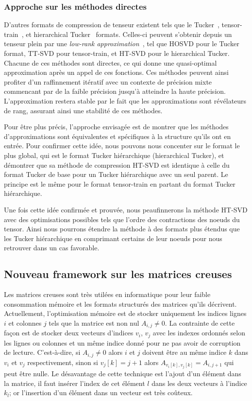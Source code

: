 \subsubsection*{Approche sur les méthodes directes}

D'autres formats de compression de tenseur existent tels que le
Tucker~\cite{tucker66, dedeva20b}, tensor-train~\cite{os11}, et hierarchical
Tucker~\cite{haku09, gras10} formats. Celles-ci peuvent s'obtenir depuis un
tenseur plein par une \textit{low-rank approximation}~\cite{koba09, os11}, tel
que HOSVD pour le Tucker format, TT-SVD pour tensor-train, et HT-SVD pour le
hierarchical Tucker. Chacune de ces méthodes sont directes, ce qui donne une
quasi-optimal approximation après un appel de ces fonctions. Ces méthodes
peuvent ainsi profiter d'un raffinnement itératif avec un contexte de précision
mixte commencant par de la faible précision jusqu'à atteindre la haute
précision. L'approximation restera stable par le fait que les approximations
sont révélateurs de rang, assurant ainsi une stabilité de ces méthodes.

Pour être plus précis, l'approche envisagée est de montrer que les méthodes
d'approximations sont équivalentes et spécifiques à la structure qu'ils ont en
entrée. Pour confirmer cette idée, nous pouvons nous concenter sur le format le
plus global, qui est le format Tucker hiérarchique (hierarchical Tucker), et
démontrer que sa méthode de compression HT-SVD est identique à celle du format
Tucker de base pour un Tucker hiérarchique avec un seul parent. Le principe est
le même pour le format tensor-train en partant du format Tucker hiérarchique.

Une fois cette idée confirmée et prouvée, nous peaufinnerons la méthode HT-SVD
avec des optimisations possibles tels que l'ordre des contractions des noeuds
du tensor. Ainsi nous pourrons étendre la méthode à des formats plus étendus
que les Tucker hiérarchique en comprimant certains de leur noeuds pour nous
retrouver dans un cas favorable.

\subsection{Nouveau framework sur les matrices creuses}

Les matrices creuses sont très utilées en informatique pour leur faible
consommation mémoire et les formats structurés des matrices qu'ils décrivent.
Actuellement, l'optimisation mémoire est de stocker uniquement les indices
lignes $i$ et colonnes $j$ tels que la matrice est non nul $A_{i,j} \neq 0$. La
contrainte de cette façon est de stocker deux vecteurs d'indices $v_i$, $v_j$
avec les indexes ordonnés selon les lignes ou colonnes et un même indice donné
pour ne pas avoir de corruption de lecture. C'est-à-dire, si $A_{i,j} \neq 0$
alors $i$ et $j$ doivent être au même indice $k$ dans $v_i$ et $v_j$
respectivement, sinon si $v_j[k] = j+1$ alors $A_{v_i[k],v_j[k]} = A_{i,j+1}$
qui peut être nulle. Le désavantage de cette technique est l'ajout d'un élément
dans la matrice, il faut insérer l'index de cet élément $l$ dans les deux
vecteurs à l'indice $k_l$; or l'insertion d'un élément dans un vecteur est très
coûteux.

